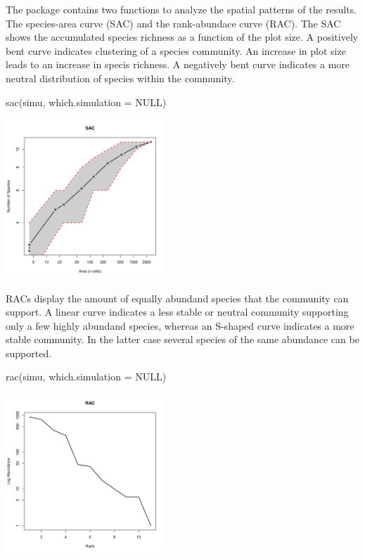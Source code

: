 \documentclass [a4paper]{tufte-book}\usepackage[]{graphicx}\usepackage[]{color}
\begin{document}
The package contains two functions to analyze the spatial patterns of the results.
The species-area curve (SAC) and the rank-abundace curve (RAC).
The SAC shows the accumulated species richness as a function of the plot size. 
A positively bent curve indicates clustering of a species community. An increase in plot size leads to an increase in specis richness. A negatively bent curve indicates a more neutral distribution of species within the community.\\
\begin{center}
\begin{Schunk}
\begin{Sinput}
sac(simu, which.simulation = NULL)
\end{Sinput}

\includegraphics[width=6cm,height=6cm]{figure/unnamed-chunk-12-1} \end{Schunk}
\end{center}
RACs display the amount of equally abundand species that the community can support. A linear curve indicates a less stable or neutral community supporting only a few highly abundand species, whereas an S-shaped curve indicates a more stable community. In the latter case several species of the same abundance can be supported.\\

\begin{center}
\begin{Schunk}
\begin{Sinput}
rac(simu, which.simulation = NULL)
\end{Sinput}

\includegraphics[width=6cm,height=6cm]{figure/unnamed-chunk-13-1} \end{Schunk}
\end{center}
\end{document}
